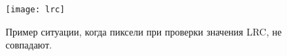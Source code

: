 \begin{figure}[!h]
	\begin{minipage}[b]{1.0\linewidth}
		\centering
		\centerline{ \texttt{[image: lrc]} }
	\end{minipage}
    \caption{Пример ситуации, когда пиксели при проверки значения LRC, не совпадают. }
	\label{fig:lrc}
\end{figure}
